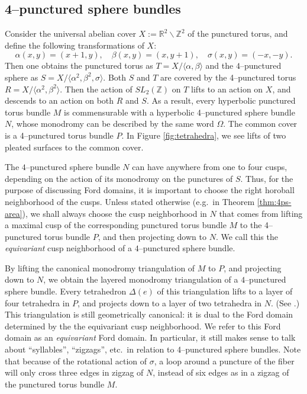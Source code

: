 \documentclass[11pt]{amsart}
\renewcommand{\setminus}{{\smallsetminus}}
\newcommand{\RR}{{\mathbb{R}}}
\newcommand{\ZZ}{{\mathbb{Z}}}
\theoremstyle{plain}
\theoremstyle{definition}
\begin{document}
\subsection{4--punctured sphere bundles}\label{sec:4ps}

Consider the universal abelian cover $X := \RR^2 \setminus \ZZ^2$ of
the punctured torus, and define the following transformations of $X$:
$$\alpha(x,y) = (x+1, y), \quad \beta(x,y) = (x,y+1), \quad
\sigma(x,y) = (-x,-y).$$
%
Then one obtains the punctured torus as $T = X/\langle\alpha, \beta
\rangle$ and the $4$--punctured sphere as $S = X/\langle\alpha^2,
\beta^2, \sigma \rangle$.  Both $S$ and $T$ are covered by the
4--punctured torus $R = X/\langle\alpha^2, \beta^2 \rangle$.  Then the
action of $SL_2(\ZZ)$ on $T$ lifts to an action on $X$, and descends
to an action on both $R$ and $S$.  As a result, every hyperbolic
punctured torus bundle $M$ is commensurable with a hyperbolic
4--punctured sphere bundle $N$, whose monodromy can be described by
the same word $\Omega$.  The common cover is a 4--punctured torus
bundle $P$.  In Figure \ref{fig:tetrahedra}, we see lifts of two
pleated surfaces to the common cover.

The $4$--punctured sphere bundle $N$ can have anywhere from one to
four cusps, depending on the action of its monodromy on the punctures
of $S$.  Thus, for the purpose of discussing Ford domains, it is
important to choose the right horoball neighborhood of the cusps.
Unless stated otherwise (e.g.\ in Theorem \ref{thm:4ps-area}), we
shall always choose the cusp neighborhood in $N$ that comes from
lifting a maximal cusp of the corresponding punctured torus bundle $M$
to the 4--punctured torus bundle $P$, and then projecting down to $N$.
We call this the \emph{equivariant} cusp neighborhood of a
$4$--punctured sphere bundle.

By lifting the canonical monodromy triangulation of $M$ to $P$, and
projecting down to $N$, we obtain the layered monodromy triangulation
of a $4$--punctured sphere bundle.  Every tetrahedron $\Delta(e)$ of
this triangulation lifts to a layer of four tetrahedra in $P$, and
projects down to a layer of two tetrahedra in $N$.  (See \cite[Figure
16]{gf:two-bridge}.)  This triangulation is still geometrically
canonical: it is dual to the Ford domain determined by the the
equivariant cusp neighborhood.  We refer to this Ford domain as an
\emph{equivariant} Ford domain.  In particular, it still makes sense
to talk about ``syllables'', ``zigzags'', etc.\ in relation to
4--punctured sphere bundles.  Note that because of the rotational
action of $\sigma$, a loop around a puncture of the fiber will only
cross three edges in zigzag of $N$, instead of six edges as in a
zigzag of the punctured torus bundle $M$.
\end{document}
